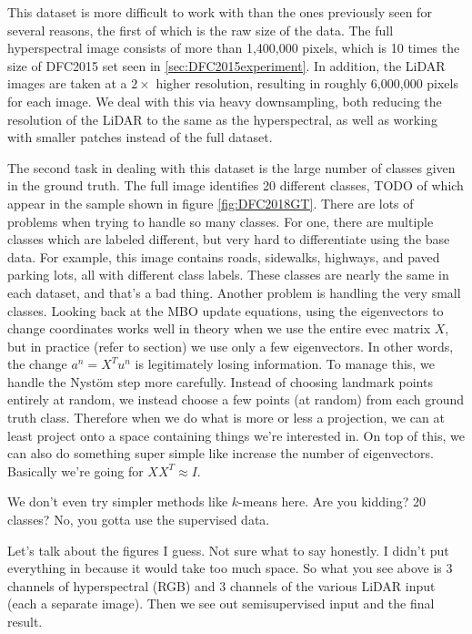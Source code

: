 \documentclass[journal]{IEEEtran}
\begin{document}
This dataset is more difficult to work with than the ones previously seen for several reasons, the first of which is the raw size of the data. The full hyperspectral image consists of more than 1,400,000 pixels, which is 10 times the size of DFC2015 set seen in \ref{sec:DFC2015experiment}. In addition, the LiDAR images are taken at a $2\times$ higher resolution, resulting in roughly 6,000,000 pixels for each image. We deal with this via heavy downsampling, both reducing the resolution of the LiDAR to the same as the hyperspectral, as well as working with smaller patches instead of the full dataset.

The second task in dealing with this dataset is the large number of classes given in the ground truth. The full image identifies 20 different classes, TODO of which appear in the sample shown in figure \ref{fig:DFC2018GT}. %
There are lots of problems when trying to handle so many classes. For one, there are multiple classes which are labeled different, but very hard to differentiate using the base data. For example, this image contains roads, sidewalks, highways, and paved parking lots, all with different class labels. These classes are nearly the same in each dataset, and that's a bad thing.
Another problem is handling the very small classes. Looking back at the MBO update equations, using the eigenvectors to change coordinates works well in theory when we use the entire evec matrix $X$, but in practice (refer to section) we use only a few eigenvectors. In other words, the change $a^n = X^Tu^n$ is legitimately losing information. To manage this, we handle  the Nyst\"{o}m step more carefully. Instead of choosing landmark points entirely at random, we instead choose a few points (at random) from each ground truth class. Therefore when we do what is more or less a projection, we can at least project onto a space containing things we're interested in. On top of this, we can also do something super simple like increase the number of eigenvectors. Basically we're going for $XX^T \approx I$.

We don't even try simpler methods like $k$-means here. Are you kidding? 20 classes? No, you gotta use the supervised data.

Let's talk about the figures I guess. Not sure what to say honestly. I didn't put everything in because it would take too much space. So what you see above is 3 channels of hyperspectral (RGB) and 3 channels of the various LiDAR input (each a separate image). Then we see out semisupervised input and the final result.
\end{document}

